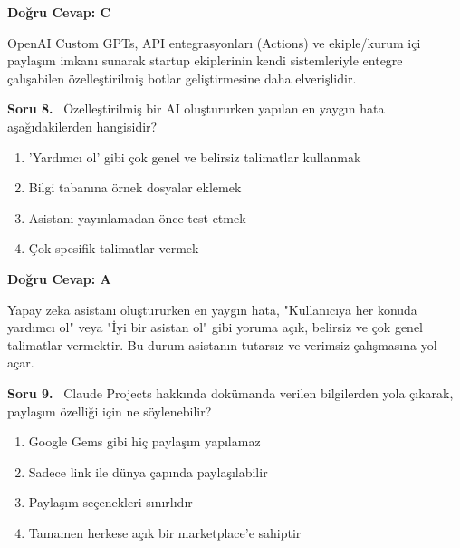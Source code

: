 \documentclass[11pt,a4paper,openany]{book}
\begin{document}
\vspace{4pt}
\begin{tcolorbox}[title=Cevap ve Açıklama, colback=gray!3!white, colframe=primarycolor!90!black, arc=2mm, fonttitle=\bfseries\sffamily, top=6pt, bottom=6pt]
    \textbf{Doğru Cevap: C}

    \vspace{2pt}
    OpenAI Custom GPTs, API entegrasyonları (Actions) ve ekiple/kurum içi paylaşım imkanı sunarak startup ekiplerinin kendi sistemleriyle entegre çalışabilen özelleştirilmiş botlar geliştirmesine daha elverişlidir.
\end{tcolorbox}
\vspace{10pt}
\needspace{5cm}
\vspace{8pt}
\noindent\textbf{\large\sffamily Soru 8.} \ Özelleştirilmiş bir AI oluştururken yapılan en yaygın hata aşağıdakilerden hangisidir?

\begin{enumerate}[label=\Alph*), leftmargin=25pt, topsep=4pt, itemsep=2pt]
        \item 'Yardımcı ol' gibi çok genel ve belirsiz talimatlar kullanmak
        \item Bilgi tabanına örnek dosyalar eklemek
        \item Asistanı yayınlamadan önce test etmek
        \item Çok spesifik talimatlar vermek
\end{enumerate}

\vspace{4pt}
\begin{tcolorbox}[title=Cevap ve Açıklama, colback=gray!3!white, colframe=primarycolor!90!black, arc=2mm, fonttitle=\bfseries\sffamily, top=6pt, bottom=6pt]
    \textbf{Doğru Cevap: A}

    \vspace{2pt}
    Yapay zeka asistanı oluştururken en yaygın hata, "Kullanıcıya her konuda yardımcı ol" veya "İyi bir asistan ol" gibi yoruma açık, belirsiz ve çok genel talimatlar vermektir. Bu durum asistanın tutarsız ve verimsiz çalışmasına yol açar.
\end{tcolorbox}
\vspace{10pt}
\needspace{5cm}
\vspace{8pt}
\noindent\textbf{\large\sffamily Soru 9.} \ Claude Projects hakkında dokümanda verilen bilgilerden yola çıkarak, paylaşım özelliği için ne söylenebilir?

\begin{enumerate}[label=\Alph*), leftmargin=25pt, topsep=4pt, itemsep=2pt]
        \item Google Gems gibi hiç paylaşım yapılamaz
        \item Sadece link ile dünya çapında paylaşılabilir
        \item Paylaşım seçenekleri sınırlıdır
        \item Tamamen herkese açık bir marketplace'e sahiptir
\end{enumerate}
\end{document}
